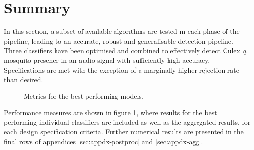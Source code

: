 \section{Summary}
\label{sec:exp-summary}
    In this section, a subset of available algorithms are tested in each phase of the pipeline, leading to an accurate, robust and generalisable detection pipeline. Three classifiers have been optimised and combined to effectively detect Culex \textit{q.} mosquito presence in an audio signal with sufficiently high accuracy. Specifications are met with the exception of a marginally higher rejection rate than desired. 
    \begin{figure}[ht]
        \scriptsize
        \singlespacing
        \centering
        \qquad
        \caption{Metrics for the best performing models.}
        \label{fig:exp-summary-metrics}
        
    \end{figure}
    Performance measures are shown in figure \ref{fig:exp-summary-metrics}, where results for the best performing individual classifiers are included as well as the aggregated results, for each design specification criteria. Further numerical results are presented in the final rows of appendices \ref{sec:appdx-postproc} and \ref{sec:appdx-agg}.
    
    
    
    